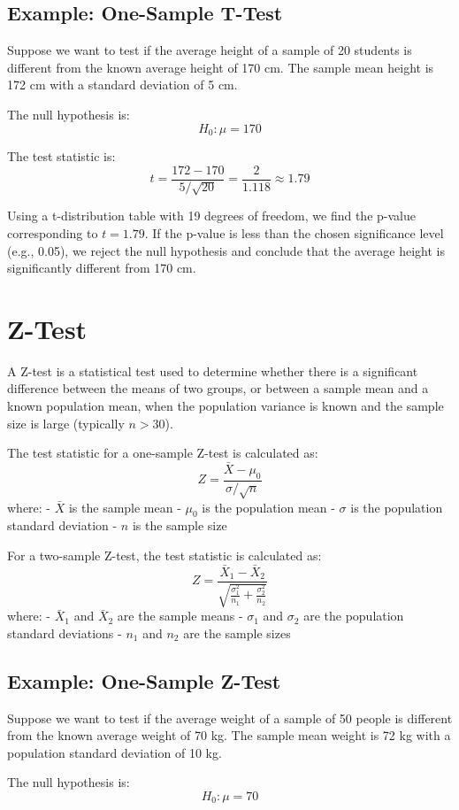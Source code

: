 \documentclass{article}
\begin{document}
\subsection{Example: One-Sample T-Test}
Suppose we want to test if the average height of a sample of 20 students is different from the known average height of 170 cm. The sample mean height is 172 cm with a standard deviation of 5 cm.

The null hypothesis is:
\[
H_0: \mu = 170
\]

The test statistic is:
\[
t = \frac{172 - 170}{5 / \sqrt{20}} = \frac{2}{1.118} \approx 1.79
\]

Using a t-distribution table with 19 degrees of freedom, we find the p-value corresponding to \(t = 1.79\). If the p-value is less than the chosen significance level (e.g., 0.05), we reject the null hypothesis and conclude that the average height is significantly different from 170 cm.

\section{Z-Test}
A Z-test is a statistical test used to determine whether there is a significant difference between the means of two groups, or between a sample mean and a known population mean, when the population variance is known and the sample size is large (typically \(n > 30\)).

The test statistic for a one-sample Z-test is calculated as:
\[
Z = \frac{\bar{X} - \mu_0}{\sigma / \sqrt{n}}
\]
where:
- \(\bar{X}\) is the sample mean
- \(\mu_0\) is the population mean
- \(\sigma\) is the population standard deviation
- \(n\) is the sample size

For a two-sample Z-test, the test statistic is calculated as:
\[
Z = \frac{\bar{X}_1 - \bar{X}_2}{\sqrt{\frac{\sigma_1^2}{n_1} + \frac{\sigma_2^2}{n_2}}}
\]
where:
- \(\bar{X}_1\) and \(\bar{X}_2\) are the sample means
- \(\sigma_1\) and \(\sigma_2\) are the population standard deviations
- \(n_1\) and \(n_2\) are the sample sizes

\subsection{Example: One-Sample Z-Test}
Suppose we want to test if the average weight of a sample of 50 people is different from the known average weight of 70 kg. The sample mean weight is 72 kg with a population standard deviation of 10 kg.

The null hypothesis is:
\[
H_0: \mu = 70
\]
\end{document}
